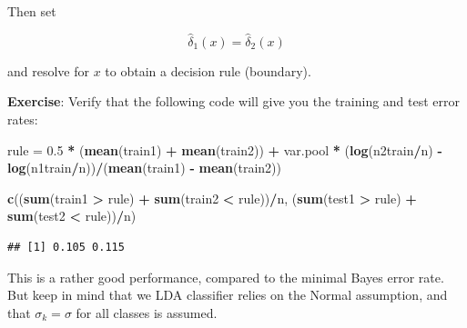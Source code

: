 \documentclass[10pt,ignorenonframetext,]{beamer}
\newenvironment{Shaded}{\begin{snugshade}}{\end{snugshade}}
\newcommand{\KeywordTok}[1]{\textcolor[rgb]{0.13,0.29,0.53}{\textbf{#1}}}
\newcommand{\FloatTok}[1]{\textcolor[rgb]{0.00,0.00,0.81}{#1}}
\newcommand{\StringTok}[1]{\textcolor[rgb]{0.31,0.60,0.02}{#1}}
\newcommand{\OperatorTok}[1]{\textcolor[rgb]{0.81,0.36,0.00}{\textbf{#1}}}
\newcommand{\NormalTok}[1]{#1}
\begin{document}
\begin{frame}[fragile]

Then set

\[\hat\delta_1(x) = \hat\delta_2(x)\]

and resolve for \(x\) to obtain a decision rule (boundary).

\vspace{2mm} \textbf{Exercise}: Verify that the following code will give
you the training and test error rates:

\scriptsize

\begin{Shaded}
\begin{Highlighting}[]
\NormalTok{rule =}\StringTok{ }\FloatTok{0.5} \OperatorTok{*}\StringTok{ }\NormalTok{(}\KeywordTok{mean}\NormalTok{(train1) }\OperatorTok{+}\StringTok{ }\KeywordTok{mean}\NormalTok{(train2)) }\OperatorTok{+}\StringTok{ }\NormalTok{var.pool }\OperatorTok{*}\StringTok{ }\NormalTok{(}\KeywordTok{log}\NormalTok{(n2train}\OperatorTok{/}\NormalTok{n) }\OperatorTok{-}\StringTok{ }
\StringTok{    }\KeywordTok{log}\NormalTok{(n1train}\OperatorTok{/}\NormalTok{n))}\OperatorTok{/}\NormalTok{(}\KeywordTok{mean}\NormalTok{(train1) }\OperatorTok{-}\StringTok{ }\KeywordTok{mean}\NormalTok{(train2))}

\KeywordTok{c}\NormalTok{((}\KeywordTok{sum}\NormalTok{(train1 }\OperatorTok{>}\StringTok{ }\NormalTok{rule) }\OperatorTok{+}\StringTok{ }\KeywordTok{sum}\NormalTok{(train2 }\OperatorTok{<}\StringTok{ }\NormalTok{rule))}\OperatorTok{/}\NormalTok{n, (}\KeywordTok{sum}\NormalTok{(test1 }\OperatorTok{>}\StringTok{ }\NormalTok{rule) }\OperatorTok{+}\StringTok{ }\KeywordTok{sum}\NormalTok{(test2 }\OperatorTok{<}\StringTok{ }
\StringTok{    }\NormalTok{rule))}\OperatorTok{/}\NormalTok{n)}
\end{Highlighting}
\end{Shaded}

\begin{verbatim}
## [1] 0.105 0.115
\end{verbatim}

\normalsize

This is a rather good performance, compared to the minimal Bayes error
rate. But keep in mind that we LDA classifier relies on the Normal
assumption, and that \(\sigma_k=\sigma\) for all classes is assumed.

\end{frame}
\end{document}
